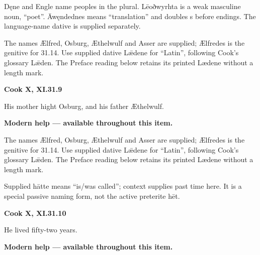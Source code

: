 Dęne and Engle name peoples in the plural. Lēoðwyrhta is a weak masculine noun, “poet”. Āwęndednes means “translation” and doubles s before endings. The language-name dative is supplied separately.

The names Ælfred, Osburg, Æthelwulf and Asser are supplied; Ælfredes is the genitive for 31.14. Use supplied dative Lǣdene for “Latin”, following Cook’s glossary Lǣden. The Preface reading below retains its printed Lædene without a length mark.

\par\begin{minipage}{\linewidth}\raggedright
\textbf{Cook X, XI.31.9}

His mother hight Osburg, and his father Æthelwulf.

\textbf{Modern help — available throughout this item.}

\end{minipage}\par\addvspace{4pt}

The names Ælfred, Osburg, Æthelwulf and Asser are supplied; Ælfredes is the genitive for 31.14. Use supplied dative Lǣdene for “Latin”, following Cook’s glossary Lǣden. The Preface reading below retains its printed Lædene without a length mark.

Supplied hātte means “is/\allowbreak{}was called”; context supplies past time here. It is a special passive naming form, not the active preterite hēt.

\par\begin{minipage}{\linewidth}\raggedright
\textbf{Cook X, XI.31.10}

He lived fifty-two years.

\textbf{Modern help — available throughout this item.}

\end{minipage}\par\addvspace{4pt}

